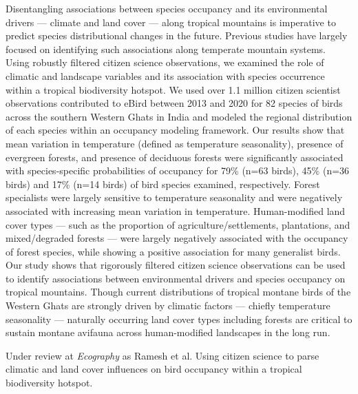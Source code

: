 \footnotesize{
    Disentangling associations between species occupancy and its environmental drivers --- climate and land cover --- along tropical mountains is imperative to predict species distributional changes in the future. 
    Previous studies have largely focused on identifying such associations along temperate mountain systems. 
    Using robustly filtered citizen science observations, we examined the role of climatic and landscape variables and its association with species occurrence within a tropical biodiversity hotspot. 
    We used over 1.1 million citizen scientist observations contributed to eBird between 2013 and 2020 for 82 species of birds across the southern Western Ghats in India and modeled the regional distribution of each species within an occupancy modeling framework. 
    Our results show that mean variation in temperature (defined as temperature seasonality), presence of evergreen forests, and presence of deciduous forests were significantly associated with species-specific probabilities of occupancy for 79\% (n=63 birds), 45\% (n=36 birds) and 17\% (n=14 birds) of bird species examined, respectively. 
    Forest specialists were largely sensitive to temperature seasonality and were negatively associated with increasing mean variation in temperature. 
    Human-modified land cover types --- such as the proportion of agriculture/settlements, plantations, and mixed/degraded forests --- were largely negatively associated with the occupancy of forest species, while showing a positive association for many generalist birds. 
    Our study shows that rigorously filtered citizen science observations can be used to identify associations between environmental drivers and species occupancy on tropical mountains. 
    Though current distributions of tropical montane birds of the Western Ghats are strongly driven by climatic factors --- chiefly temperature seasonality --- naturally occurring land cover types including forests are critical to sustain montane avifauna across human-modified landscapes in the long run.

    \medskip

    \noindent {\large{\color{Maroon}$\Delta$}} Under review at \textit{Ecography} as Ramesh et al. Using citizen science to parse climatic and land cover influences on bird occupancy within a tropical biodiversity hotspot.
}

\clearpage

